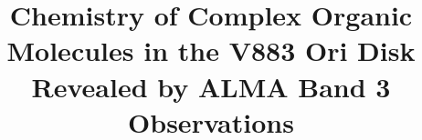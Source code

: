 \documentclass[twocolumn, twocolappendix, astrosymb, times]{aastex631}
\begin{document}
\title{Chemistry of Complex Organic Molecules in the V883 Ori Disk Revealed by ALMA Band 3 Observations}


\end{document}
